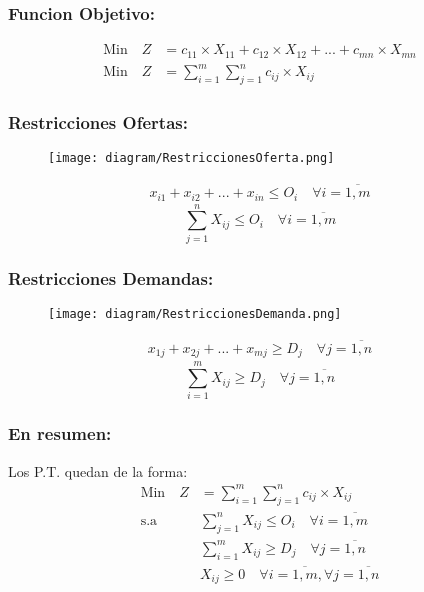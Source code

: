 \documentclass{templateNote}
\begin{document}
\subsubsection*{Funcion Objetivo:}
\begin{align*}
    \text{Min} \quad Z &= c_{11} \times X_{11} + c_{12} \times X_{12} + ... + c_{mn} \times X_{mn} \\
    \text{Min} \quad Z &= \sum_{i=1}^{m}{\sum_{j=1}^{n}{c_{ij} \times X_{ij}}}
\end{align*}

\newpage
\subsubsection*{Restricciones Ofertas:}
\begin{figure}[H]
    \centering
    \texttt{[image: diagram/RestriccionesOferta.png]}
\end{figure}
\begin{align*}
    x_{i1} + x_{i2} + ... + x_{in} \leq O_i \quad \forall i = \overline{1,m}
\end{align*}
\begin{equation*}
    \sum_{j=1}^{n}{X_{ij}} \leq O_i \quad \forall i = \overline{1,m}
\end{equation*}

\subsubsection*{Restricciones Demandas:}
\begin{figure}[H]
    \centering
    \texttt{[image: diagram/RestriccionesDemanda.png]}
\end{figure}
\begin{align*}
    x_{1j} + x_{2j} + ... + x_{mj} \geq D_j \quad \forall j = \overline{1,n}
\end{align*}
\begin{equation*}
    \sum_{i=1}^{m}{X_{ij}} \geq D_j \quad \forall j = \overline{1,n}
\end{equation*}

\newpage
\subsubsection*{En resumen:}
Los P.T. quedan de la forma:
\begin{align*}
    \text{Min} \quad Z &= \sum_{i=1}^{m}{\sum_{j=1}^{n}{c_{ij} \times X_{ij}}} \\
    \text{s.a} \quad & \sum_{j=1}^{n}{X_{ij}} \leq O_i \quad \forall i = \overline{1,m} \\
    & \sum_{i=1}^{m}{X_{ij}} \geq D_j \quad \forall j = \overline{1,n} \\
    & X_{ij} \geq 0 \quad \forall i = \overline{1,m}, \forall j = \overline{1,n}
\end{align*}
\end{document}
